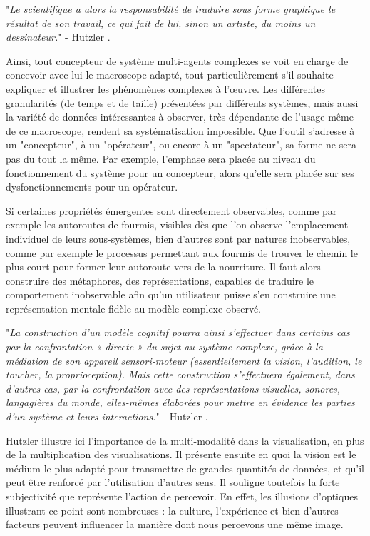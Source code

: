 		"\textit{Le scientifique a alors la responsabilité de traduire sous forme graphique le résultat de son travail, ce qui fait de lui, sinon un artiste, du moins un dessinateur.}" - Hutzler \cite{hutzler_du_2000}.

	Ainsi, tout concepteur de système multi-agents complexes se voit en charge de concevoir avec lui le macroscope adapté, tout particulièrement s'il souhaite expliquer et illustrer les phénomènes complexes à l'œuvre. Les différentes granularités (de temps et de taille) présentées par différents systèmes, mais aussi la variété de données intéressantes à observer, très dépendante de l'usage même de ce macroscope, rendent sa systématisation impossible. Que l'outil s'adresse à un "concepteur", à un "opérateur", ou encore à un "spectateur", sa forme ne sera pas du tout la même. Par exemple, l'emphase sera placée au niveau du fonctionnement du système pour un concepteur, alors qu'elle sera placée sur ses dysfonctionnements pour un opérateur.
		
	
	Si certaines propriétés émergentes sont directement observables, comme par exemple les autoroutes de fourmis, visibles dès que l'on observe l'emplacement individuel de leurs sous-systèmes, bien d'autres sont par natures inobservables, comme par exemple le processus permettant aux fourmis de trouver le chemin le plus court pour former leur autoroute vers de la nourriture. Il faut alors construire des métaphores, des représentations, capables de traduire le comportement inobservable afin qu'un utilisateur puisse s'en construire une représentation mentale fidèle au modèle complexe observé.

		"\textit{La construction d'un modèle cognitif pourra ainsi s'effectuer dans certains cas par la confrontation « directe » du sujet au système complexe, grâce à la médiation de son appareil sensori-moteur (essentiellement la vision, l'audition, le toucher, la proprioception). Mais cette construction s'effectuera également, dans d'autres cas, par la confrontation avec des représentations visuelles, sonores, langagières du monde, elles-mêmes élaborées pour mettre en évidence les parties d'un système et leurs interactions.}" - Hutzler \cite{hutzler_du_2000}.
		
		Hutzler illustre ici l'importance de la multi-modalité dans la visualisation, en plus de la multiplication des visualisations. Il présente ensuite en quoi la vision est le médium le plus adapté pour transmettre de grandes quantités de données, et qu'il peut être renforcé par l'utilisation d'autres sens. Il souligne toutefois la forte subjectivité que représente l'action de percevoir. En effet, les illusions d'optiques illustrant ce point sont nombreuses : la culture, l'expérience et bien d'autres facteurs peuvent influencer la manière dont nous percevons une même image.
		
